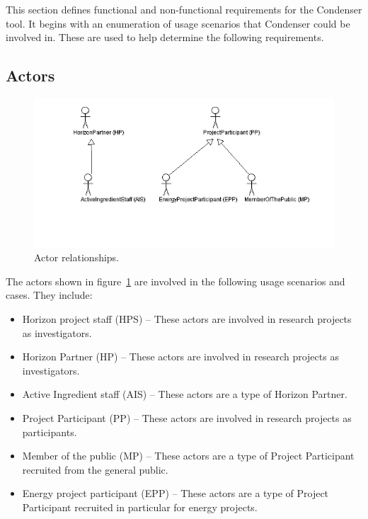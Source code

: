 This section defines functional and non-functional requirements for the Condenser tool. It begins with an enumeration of usage scenarios that Condenser could be involved in. These are used to help determine the following requirements.

\subsection{Actors}
\begin{center}
	\begin{figure}[htbp]
		\includegraphics[scale=.5]{images/ActorRelationships.png}
		\caption{Actor relationships.\label{ActorRelationships}}
	\end{figure}
\end{center}	
The actors shown in figure~\ref{ActorRelationships} are involved in the following usage scenarios and cases. They include:
\begin{itemize}
	\item Horizon project staff (HPS) -- These actors are involved in research projects as investigators.
	\item Horizon Partner (HP) -- These actors are involved in research projects as investigators. 
	\item Active Ingredient staff (AIS) -- These actors are a type of Horizon Partner. 
	\item Project Participant (PP) -- These actors are involved in research projects as participants. 
	\item Member of the public (MP) -- These actors are a type of Project Participant recruited from the general public.
	\item Energy project participant (EPP) -- These actors are a type of Project Participant recruited in particular for energy projects.
\end{itemize}


